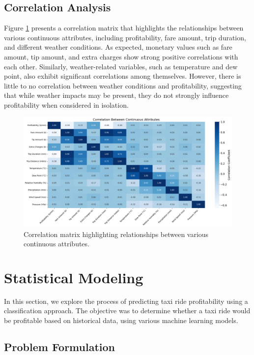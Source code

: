 \documentclass[11pt]{article}
\begin{document}
\subsection{Correlation Analysis}
Figure \ref{fig:corr} presents a correlation matrix that highlights the relationships between various continuous attributes, including profitability, fare amount, trip duration, and different weather conditions. As expected, monetary values such as fare amount, tip amount, and extra charges show strong positive correlations with each other. Similarly, weather-related variables, such as temperature and dew point, also exhibit significant correlations among themselves. However, there is little to no correlation between weather conditions and profitability, suggesting that while weather impacts may be present, they do not strongly influence profitability when considered in isolation.

\pagebreak

\begin{figure}[h]
    \centering
    \includegraphics[width=\textwidth]{plots/corr.png}
    \caption{Correlation matrix highlighting relationships between various continuous attributes.}
    \label{fig:corr}
\end{figure}

\section{Statistical Modeling}

In this section, we explore the process of predicting taxi ride profitability using a classification approach. The objective was to determine whether a taxi ride would be profitable based on historical data, using various machine learning models.

\subsection{Problem Formulation}
\end{document}
